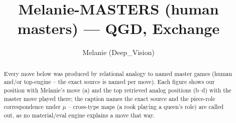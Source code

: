 \documentclass[11pt]{article}
\title{Melanie-MASTERS (human masters) — QGD, Exchange}
\author{Melanie (Deep\_Vision)}
\date{}
\begin{document}
\maketitle

\begin{abstract}Every move below was produced by relational analogy to named master games (human and/or top-engine -- the exact source is named per move). Each figure shows our position with Melanie's move (a) and the top retrieved analog positions (b--d) with the master move played there; the caption names the exact source and the piece-role correspondence under $\mu$ -- cross-type maps (a rook playing a queen's role) are called out, as no material/eval engine explains a move that way.\end{abstract}

\begin{figure}[p]\centering
\begin{subfigure}{0.46\textwidth}\centering
\resizebox{\linewidth}{!}{%
\newchessgame
\chessboard[
  setfen={rnbqk2r/pp2bppp/2p2n2/3p2B1/3P4/2N1P3/PPQ2PPP/R3KBNR b KQkq - 1 7},
  showmover=false,
  pgfstyle=straightmove, color=movearrow, markmove={e8-g8}
]}
\caption{}
\end{subfigure}\hfill
\begin{subfigure}{0.46\textwidth}\centering
\resizebox{\linewidth}{!}{%
\newchessgame
\chessboard[
  setfen={r3k2r/pp2ppbp/1qp2np1/8/3P2bP/2P2N2/PP2BPP1/R1BQK2R w KQkq - 2 11},
  showmover=false,
  pgfstyle=straightmove, color=movearrow, markmove={e1-g1}
]}
\caption{}
\end{subfigure}
\\[4pt]
\begin{subfigure}{0.46\textwidth}\centering
\resizebox{\linewidth}{!}{%
\newchessgame
\chessboard[
  setfen={r3k2r/1p1qbppp/p3pn2/3pBb2/3P4/1QN1P3/PP2BPPP/2R1K2R b Kkq - 0 12},
  showmover=false,
  pgfstyle=straightmove, color=movearrow, markmove={e8-g8}
]}
\caption{}
\end{subfigure}\hfill
\begin{subfigure}{0.46\textwidth}\centering
\resizebox{\linewidth}{!}{%
\newchessgame
\chessboard[
  setfen={r2qk2r/pp2bppp/2p2n2/3pB3/3P4/2NQP3/PP3PPP/R3K2R b KQkq - 0 11},
  showmover=false,
  pgfstyle=straightmove, color=movearrow, markmove={e8-g8}
]}
\caption{}
\end{subfigure}

\end{figure}
\end{document}

